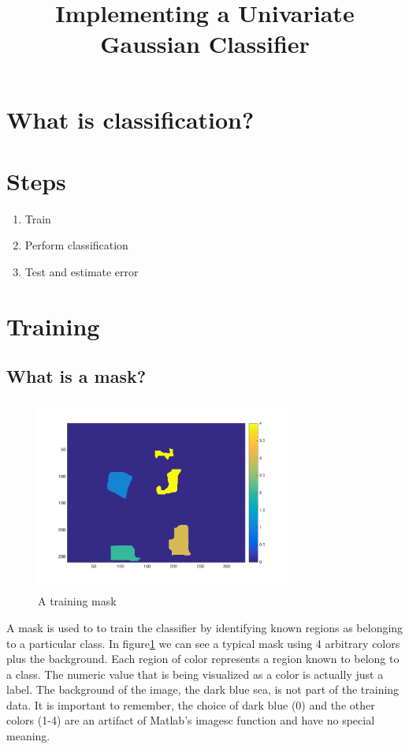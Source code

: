 \documentclass[12pt,a4paper]{report}
\title{Implementing a Univariate Gaussian Classifier}
\begin{document}
\maketitle
\section{What is classification?}

\section{Steps}
\begin{enumerate}
	\item Train
	\item Perform classification
	\item Test and estimate error
\end{enumerate}

\section{Training}
\subsection{What is a mask?}
\begin{figure}
\centering
\includegraphics[width=0.75\textwidth]{TrainingMask}
\caption{A training mask}
\label{fig:TrainingMask}
\end{figure}

A mask is used to to train the classifier by identifying known regions as belonging to a particular class. In figure\ref{fig:TrainingMask} we can see a typical mask using 4 arbitrary colors plus the background. Each region of color represents a region known to belong to a class. The numeric value that is being visualized as a color is actually just a label. The background of the image, the dark blue sea, is not part of the training data. It is important to remember, the  choice of dark blue (0) and the other colors (1-4) are an artifact of Matlab's imagesc function and have no special meaning.
\end{document}
